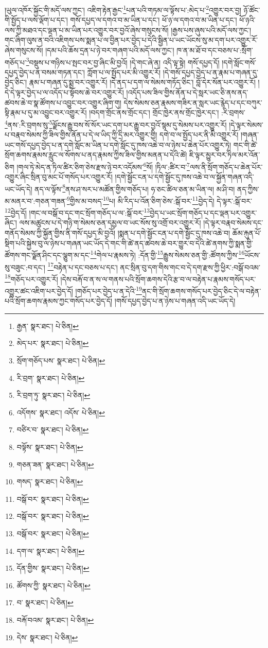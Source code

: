 །ཡུལ་འཁོར་སྐྱོང་གི་མདོ་ལས་ཀྱང་། འཇིག་རྟེན་རྒྱང་\footnote{རྒྱན་  སྣར་ཐང་།  པེ་ཅིན། }པན་པའི་གཏམ་ལ་ལྟོས་པ་:མེད་པ་\footnote{མེད་པར་  སྣར་ཐང་།  པེ་ཅིན། }འགྱུར་བར་བྱ། ཉོ་ཚོང་གི་སྤྱོད་པ་ལས་ལྡོག་པ་དང་། གསོ་དཔྱད་ལ་དགའ་བ་མ་ཡིན་པ་དང་། ཕོ་ཉ་ལ་དགའ་བ་མ་ཡིན་པ་དང་། ཕོ་ཉའི་ལས་ཀྱི་མཐའ་དང་ལྡན་པ་མ་ཡིན་པར་འགྱུར་བར་བྱའོ་ཞེས་གསུངས་སོ། །རྒྱས་པས་ཞུས་པའི་མདོ་ལས་ཀྱང་། གང་ཞིག་ལུས་ན་བའི་འཇིགས་པས་སྨན་པ་ལ་བྱིན་པར་བྱེད་པ་དེའི་སྦྱིན་པ་ཡང་ཡོངས་སུ་མ་དག་པར་འགྱུར་རོ་ཞེས་གསུངས་སོ། །དམ་པའི་ཆོས་དྲན་པ་ཉེ་བར་གཞག་པའི་མདོ་ལས་ཀྱང་། ཁ་ན་མ་ཐོ་བ་དང་བཅས་པ་:སྲོག་གཅོད་པ་\footnote{སྲོག་གཅོད་པས་  སྣར་ཐང་།  པེ་ཅིན། }བསྡུས་པ་གཉིས་པ་སྤང་བར་བྱ་ཞིང་མི་བྱའོ། །དེ་གང་ཞེ་ན། འདི་ལྟ་སྟེ། གསོ་དཔྱད་དོ། །དགེ་སློང་གསོ་དཔྱད་བྱེད་པ་ན་བསམ་གཏན་དང་། ཀློག་པ་ལ་སྤྱོད་པར་མི་འགྱུར་རོ། །དེ་གསོ་དཔྱད་བྱེད་པ་ན་རྣམ་པ་གཞན་དུ་བྱེད་ཅིང་། རྣམ་པ་གཞན་དུ་སྨྲ་བར་འགྱུར་རོ། །དེ་ནད་པ་དག་ལ་སེམས་གཏོད་ཅིང་། བློ་དེར་སོན་པར་འགྱུར་རོ། །དེ་དེ་ལྟར་བྱེད་པ་ལ་འདོད་པ་སྟོབས་ཆེ་བར་འགྱུར་རོ། །འདོད་པས་ཟིལ་གྱིས་ནོན་པ་དེ་སླར་ཡང་ཅི་ནས་ནད་ཚབས་ཆེ་བ་སྣ་ཚོགས་པ་འབྱུང་བར་འགྱུར་ཞིག་གུ། དེས་སེམས་ཅན་རྣམས་གཟིར་ན་སླར་ཡང་རྙེད་པ་དང་བཀུར་སྟི་རྣམ་པ་དུ་མ་འབྱུང་བར་འགྱུར་རོ། །བདག་གྲོང་ནས་གྲོང་དང་། གྲོང་ཁྱེར་ནས་གྲོང་ཁྱེར་དང་། :རི་བྲགས་\footnote{རི་བྲག་  སྣར་ཐང་།  པེ་ཅིན། }ནས་:རི་བྲགས་སུ་\footnote{རི་བྲག་ཏུ་  སྣར་ཐང་།  པེ་ཅིན། }ལྗོངས་རྒྱུ་བས་སོ་སོར་ཡང་དག་པར་རྒྱུ་བར་བྱའོ་སྙམ་དུ་སེམས་པར་འགྱུར་རོ། །དེ་ལྟར་སེམས་པ་བརྣབ་སེམས་ཀྱི་ཟིལ་གྱིས་ནོན་པ་དེ་ལ་ཡིད་ཀྱི་དྲི་མར་འགྱུར་གྱི། དགེ་བ་ལ་སྤྱོད་པར་ནི་མི་འགྱུར་རོ། །གཞན་ཡང་གསོ་དཔྱད་བྱེད་པ་ན་དགེ་སློང་མ་ཡིན་པ་དགེ་སློང་དུ་ཁས་འཆེ་བ་ལ་ཉེས་པ་ཆེན་པོར་འགྱུར་ཏེ། གང་གི་ཚེ་སྲོག་ཆགས་རྣམས་རླུང་ལ་སོགས་པ་ནད་རྣམས་ཀྱིས་ཟིལ་གྱིས་མནན་པ་དེའི་ཚེ། ཇི་ལྟར་མྱུར་བར་ཏིལ་མར་འོན་ཅིག །གལ་ཏེ་མེད་ན་ཏིལ་ཚིར་ཅིག་ཅེས་རྫས་ཉེ་བར་འདོམས་\footnote{འདོགས་  སྣར་ཐང་། འདོས་  པེ་ཅིན། }སོ། །ཏིལ་:ཚིར་བ་\footnote{བཙིར་བ་  སྣར་ཐང་།  པེ་ཅིན། }ལས་ནི་སྲོག་གཅོད་པ་ཆེན་པོར་འགྱུར་ཞིང་སྲིན་བུ་མང་པོ་གསོད་པར་འགྱུར་རོ། །དགེ་སྦྱོང་ངན་པ་དགེ་སྦྱོང་དུ་ཁས་འཆེ་བ་ལ་སྐྱོན་གཞན་འདི་ཡང་ཡོད་དེ། ནད་ལ་ལྟོས་\footnote{བལྟོས་  སྣར་ཐང་།  པེ་ཅིན། }ནས་ཤ་སར་པ་མཚོན་གྱིས་གཅོད་པ། ཧ་ཅང་ཚིལ་ཅན་མ་ཡིན་ལ། མ་ཤི་བ། ནད་ཀྱིས་མ་མནར་བ་:གཅན་གཟན་\footnote{གཅན་ཟན་  སྣར་ཐང་།  པེ་ཅིན། }གྱིས་མ་བསད་\footnote{གསད་  སྣར་ཐང་།  པེ་ཅིན། }པ། མི་རིད་པ་འོན་ཅིག་ཅེས་:སྒོ་བར་\footnote{བསྒོ་བར་  སྣར་ཐང་།  པེ་ཅིན། }བྱེད་དེ། དེ་ལྟར་:སྒོ་བར་\footnote{བསྒོ་བར་  སྣར་ཐང་།  པེ་ཅིན། }བྱེད་དོ། །གང་ལ་བསྒོ་བ་དང་གང་སྲོག་གཅོད་པ་ལ་:སྒོ་བར་\footnote{བསྒོ་བར་  སྣར་ཐང་།  པེ་ཅིན། }བྱེད་པ་ཡང་སྲོག་གཅོད་པ་དང་ལྡན་པར་འགྱུར་ཞིང་། ལས་མཚུངས་པ་དེ་གཉི་ག་སེམས་ཅན་དམྱལ་བ་ཡང་སོས་སུ་འགྲོ་བར་འགྱུར་རོ། །དེ་ལྟར་བརྣབ་སེམས་དང་གནོད་སེམས་ཀྱི་སྐྱོན་གྱིས་ནི་གསོ་དཔྱད་མི་བྱའོ། །སྨན་པ་དགེ་སྦྱོང་ངན་པ་དགེ་སྦྱོང་དུ་ཁས་འཆེ་བ། ཆོམ་རྐུན་པོ་སྡིག་པའི་སྐྱེས་བུ་ལ་ཉེས་པ་གཞན་ཡང་ཡོད་དེ་གང་གི་ཚེ་ནད་ཚབས་ཆེ་བར་གྱུར་བ་དེའི་ཚེ་ནགས་ཀྱི་སྨན་གྱི་ཚོགས་གང་ལྗོན་ཤིང་དང་ལྕུག་མ་དང་\footnote{དག་ལ་  སྣར་ཐང་།  པེ་ཅིན། }གེལ་པ་རྣམས་ཏེ། :དོན་གྱི་\footnote{དོན་གྱིས་  སྣར་ཐང་།  པེ་ཅིན། }རྒྱུས་སེམས་ཅན་གྱི་:ཚོགས་ཀྱིས་\footnote{ཚོགས་ཀྱི་  སྣར་ཐང་།  པེ་ཅིན། }ཡོངས་སུ་བཟུང་:བ་དང་། \footnote{བ་  སྣར་ཐང་།  པེ་ཅིན། }བརྟེན་པ་དང་བཅས་པ་དང་། ནང་སྲིན་བུ་དག་གིས་གང་བ་དེ་དག་རྫས་ཀྱི་ཕྱིར་:བསྒོ་བའམ་\footnote{བརྐོ་བའམ་  སྣར་ཐང་།  པེ་ཅིན། }གཅོད་པར་འགྱུར་རོ། །དེས་བརྐོ་བ་ན་ས་ལ་གནས་པའི་སྲོག་ཆགས་དེའི་རྩ་བ་ལ་བརྟེན་པ་རྣམས་གསོད་པར་འགྱུར་ཚང་འཇིག་པར་བྱེད་དོ། །གཅོད་པར་བྱེད་པ་ན་དེའི་\footnote{དེས་  སྣར་ཐང་།  པེ་ཅིན། }ནང་གི་སྲོག་ཆགས་གསོད་པར་བྱེད་ཅིང་དེ་ལ་བརྟེན་པའི་སྲོག་ཆགས་རྣམས་ཀྱང་གསོད་པར་བྱེད་དོ། །གསོ་དཔྱད་བྱེད་པ་ན་ཉེས་པ་གཞན་འདི་ཡང་ཡོད་དེ། 